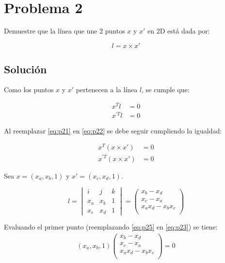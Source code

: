 \section*{Problema 2}
\setcounter{equation}{0}
Demuestre que la línea que une 2 puntos $x$ y $x'$ en 2D está dada por:

\begin{equation}
l=x \times x'
\label{eq:p21}
\end{equation} 

\subsection*{Solución}

Como los puntos $x$ y $x'$ pertenecen a la línea $l$, se cumple que:

\begin {equation}
\begin{aligned}
x^{T} l &= 0 \\
x^{'T} l &= 0
\label{eq:p22}
\end{aligned} 
\end {equation}

Al reemplazar \ref{eq:p21} en \ref{eq:p22} se debe seguir cumpliendo la igualdad:

\begin{align}
x^{T} (x \times x') &= 0 \label{eq:p23} \\
x^{'T} (x \times x') &= 0 \label{eq:p24}
\end{align} 

Sea $x=(x_a, x_b, 1)$ y $x'=(x_c, x_d,1)$.

\begin{equation}
l = 
\begin{vmatrix}
    i & j & k \\
    x_a & x_b & 1 \\
    x_c & x_d & 1
\end{vmatrix}
=
\begin{pmatrix}
    x_b -x_d \\
    x_c -x_a \\
    x_a x_d - x_b x_c \\
\end{pmatrix}
\label{eq:p25}
\end{equation} 

Evaluando el primer punto (reemplazando \ref{eq:p25} en \ref{eq:p23}) se tiene:
\begin{align*}
(x_a, x_b, 1) 
\begin{pmatrix}
    x_b -x_d \\
    x_c -x_a \\
    x_a x_d - x_b x_c \\
\end{pmatrix}
= 0
\end{align*} 

